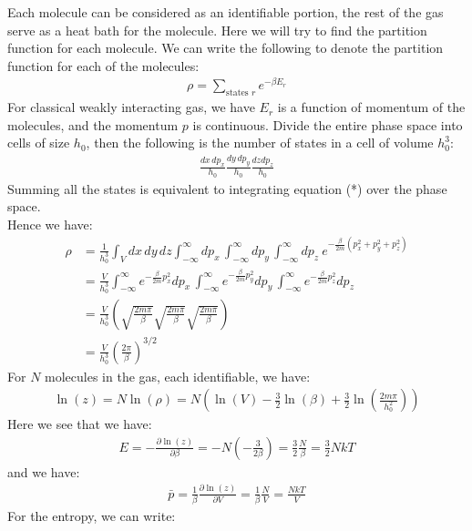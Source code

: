 \documentclass[11pt,oneside]{book}
\theoremstyle{break}
\theoremstyle{break}
\begin{document}
Each molecule can be considered as an identifiable portion, the rest of the gas serve as a heat bath for the molecule. Here we will try to find the partition function for each molecule. We can write the following to denote the partition function for each of the molecules:
\begin{align*}
\rho = \sum_{\text{states } r} e^{-\beta E_r}
\end{align*}
For classical weakly interacting gas, we have $E_r$ is a function of momentum of the molecules, and the momentum $p$ is continuous. Divide the entire phase space into cells of size $h_0$, then the following is the number of states in a cell of volume $h_0^3$:
\begin{align*}
\frac{dx\, dp_x}{h_0} \frac{dy\, dp_y}{h_0} \frac{dz dp_z}{h_0} \tag{*}
\end{align*}
Summing all the states is equivalent to integrating equation (*) over the phase space.\\ 
Hence we have:
\begin{align*}
\rho  &=  \frac{1}{h_0^3}\int_V dx\, dy\, dz \int_{-\infty}^{\infty} dp_x \, \int_{-\infty}^{\infty} dp_y \, \int_{-\infty}^{\infty} dp_z \ e^{-\frac{\beta}{2m}{(p_x^2+p_y^2+p_z^2)}} \\
&=  \frac{V}{h_0^3}\int_{-\infty}^{\infty}e^{-\frac{\beta}{2m}{p_x^2}} dp_x \, \int_{-\infty}^{\infty} e^{-\frac{\beta}{2m}{p_y^2}}dp_y \, \int_{-\infty}^{\infty} e^{-\frac{\beta}{2m}{p_z^2}} dp_z \  \\
&= \frac{V}{h_0^3}\left(\sqrt{\frac{2m\pi}{\beta}}\sqrt{\frac{2m\pi}{\beta}}\sqrt{\frac{2m\pi}{\beta}}\right)\\
&= \frac{V}{h_0^3}\left( \frac{2\pi}{\beta}\right)^{3/2}
\end{align*}
For $N$ molecules in the gas, each identifiable, we have:
\begin{align*}
\ln(z) = N \ln (\rho) = N \left( \ln(V) - \frac{3}{2}\ln(\beta) + \frac{3}{2}\ln\left( \frac{2m \pi}{h_0^2}\right)\right)
\end{align*}
Here we see that we have:
\begin{align*}
E = -\frac{\partial \ln(z)}{\partial \beta} = -N\left(- \frac{3}{2\beta}\right) = \frac{3}{2}\frac{N}{\beta} = \frac{3}{2}NkT
\end{align*}
and we have:
\begin{align*}
\bar{p} = \frac{1}{\beta}\frac{\partial \ln(z)}{\partial V} = \frac{1}{\beta} \frac{N}{V} = \frac{NkT}{V}
\end{align*}
For the entropy, we can write:
\end{document}
